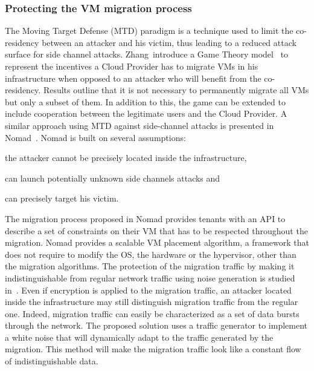 \subsubsection{Protecting the VM migration process}
The Moving Target Defense (MTD) paradigm is a technique used to limit the co-residency between an attacker and his victim, thus leading to a reduced attack surface for side channel attacks.
Zhang~\etal introduce a Game Theory model~\cite{incentivemtd-Zhang2012} to represent the incentives a Cloud Provider has to migrate VMs in his infrastructure when opposed to an attacker who will benefit from the co-residency. Results outline that it is not necessary to permanently migrate all VMs but only a subset of them. In addition to this, the game can be extended to include cooperation between the legitimate users and the Cloud Provider.
A similar approach using MTD against side-channel attacks is presented in Nomad~\cite{nomad-Moon2015b}. Nomad is built on several assumptions: 
\begin{inparaenum}[i)]
\item the attacker cannot be precisely located inside the infrastructure,
\item can launch potentially unknown side channels attacks and 
\item can precisely target his victim.
\end{inparaenum}
The migration process proposed in Nomad provides tenants with an API to describe a set of constraints on their VM that has to be respected throughout the migration.
Nomad provides a scalable VM placement algorithm, a framework that does not require to modify the OS, the hardware or the hypervisor, other than the migration algorithms.
The protection of the migration traffic by making it indistinguishable from regular network traffic using noise generation is studied in~\cite{stealth-Achleitner2017a}. Even if encryption is applied to the migration traffic, an attacker located inside the infrastructure may still distinguish migration traffic from the regular one. Indeed, migration traffic can easily be characterized as a set of data bursts through the network. The proposed solution uses a traffic generator to implement a white noise that will dynamically adapt to the traffic generated by the migration. This method will make the migration traffic look like a constant flow of indistinguishable data.

